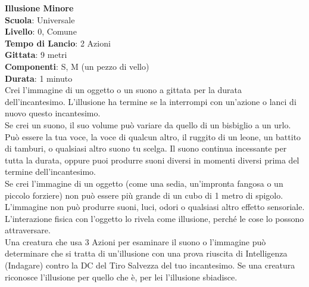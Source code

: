 \begin{multicols}{2}
\medskip\textbf{Illusione Minore}\\
\textbf{Scuola}: Universale\\
\textbf{Livello}: 0, Comune\\
\textbf{Tempo di Lancio}: 2 Azioni\\
\textbf{Gittata}: 9 metri\\
\textbf{Componenti}: S, M (un pezzo di vello)\\
\textbf{Durata}: 1 minuto\\
Crei l'immagine di un oggetto o un suono a gittata per la durata dell'incantesimo. L'illusione ha termine se la interrompi con un'azione o lanci di nuovo questo incantesimo.\\
Se crei un suono, il suo volume può variare da quello di un bisbiglio a un urlo. Può essere la tua voce, la voce di qualcun altro, il ruggito di un leone, un battito di tamburi, o qualsiasi altro suono tu scelga. Il suono continua incessante per tutta la durata, oppure puoi produrre suoni diversi in momenti diversi prima del termine dell'incantesimo.\\
Se crei l'immagine di un oggetto (come una sedia, un'impronta fangosa o un piccolo forziere) non può essere più grande di un cubo di 1 metro di spigolo. L'immagine non può produrre suoni, luci, odori o qualsiasi altro effetto sensoriale. L'interazione fisica con l'oggetto lo rivela come illusione, perché le cose lo possono attraversare.\\
Una creatura che usa 3 Azioni per esaminare il suono o l'immagine può determinare che si tratta di un'illusione con una prova riuscita di Intelligenza (Indagare) contro la DC del Tiro Salvezza del tuo incantesimo. Se una creatura riconosce l'illusione per quello che è, per lei l'illusione sbiadisce.


\end{multicols}
